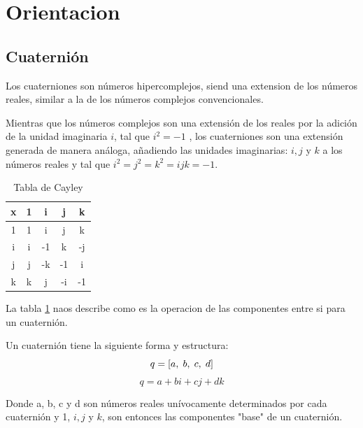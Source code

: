 \documentclass[conference]{IEEEtran}
\begin{document}
    \section{Orientacion}

    \subsection{Cuaternión}
        Los cuaterniones son números hipercomplejos, siend una extension de los números reales, similar a la de los números complejos convencionales.
        
        Mientras que los números complejos son una extensión de los reales por la adición de la unidad imaginaria \textbf{$ i $}, tal que \textbf{$ i^2 = -1 $}
        , los cuaterniones son una extensión generada de manera análoga, añadiendo las unidades imaginarias: $i, j$ y $ k $ a los números reales 
        y tal que $ i^2 = j^2 = k^2 = ijk = -1$.

            \begin{table}[htp]
                \centering
                    \begin{tabular}{|c|c|c|c|c|}
                        \hline
                        \textbf{x} & 1 & i  & j  & k \\ \hline
                             1 & 1 & i  & j  & k \\ \hline
                             i & i & -1 & k  & -j \\ \hline
                             j & j & -k & -1 & i \\ \hline
                             k & k & j  & -i & -1 \\ 
                        \hline
                    \end{tabular}
                \caption{Tabla de Cayley}
                \label{table: Cayley}
            \end{table}

        La tabla \ref{table: Cayley} naos describe como es la operacion de las componentes entre si para un cuaternión.

        Un cuaternión tiene la siguiente forma y estructura:
        $$ q = [a, \hspace{1mm} b, \hspace{1mm} c, \hspace{1mm} d]$$
        $$ q = a + bi +cj + dk $$

        Donde a, b, c y d son números reales unívocamente determinados por cada cuaternión y 
        1, $ i, j $ y $ k $, son entonces las componentes "base" de un cuaternión.
\end{document}
